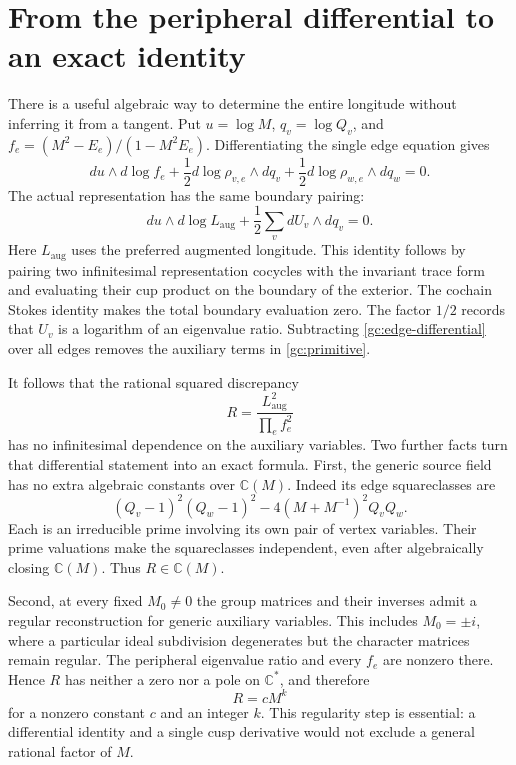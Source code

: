 \section{From the peripheral differential to an exact identity}
\label{gc:rigidity}

There is a useful algebraic way to determine the entire longitude
without inferring it from a tangent. Put
$u=\log M$, $q_v=\log Q_v$, and
$f_e=(M^2-E_e)/(1-M^2E_e)$.
Differentiating the single edge equation gives
\begin{equation}\label{gc:edge-differential}
 du\wedge d\log f_e
 +\frac12 d\log\rho_{v,e}\wedge dq_v
 +\frac12 d\log\rho_{w,e}\wedge dq_w=0.
\end{equation}
The actual representation has the same boundary pairing:
\[
 du\wedge d\log L_{\mathrm{aug}}
       +\frac12\sum_v dU_v\wedge dq_v=0.
\]
Here $L_{\mathrm{aug}}$ uses the preferred augmented longitude.
This identity follows by pairing two infinitesimal representation
cocycles with the invariant trace form and evaluating their cup
product on the boundary of the exterior. The cochain Stokes
identity makes the total boundary evaluation zero. The factor
$1/2$ records that $U_v$ is a logarithm of an eigenvalue ratio.
Subtracting \eqref{gc:edge-differential} over all edges removes
the auxiliary terms in \eqref{gc:primitive}.

It follows that the rational squared discrepancy
\begin{equation}\label{gc:discrepancy}
 R=\frac{L_{\mathrm{aug}}^2}{\prod_e f_e^2}
\end{equation}
has no infinitesimal dependence on the auxiliary variables.
Two further facts turn that differential statement into an exact
formula. First, the generic source field has no extra algebraic
constants over $\mathbb C(M)$. Indeed its edge squareclasses are
\[
 (Q_v-1)^2(Q_w-1)^2
                 -4(M+M^{-1})^2Q_vQ_w.
\]
Each is an irreducible prime involving its own pair of vertex
variables. Their prime valuations make the squareclasses
independent, even after algebraically closing $\mathbb C(M)$.
Thus $R\in\mathbb C(M)$.

Second, at every fixed $M_0\ne0$ the group matrices and their
inverses admit a regular reconstruction for generic auxiliary
variables. This includes $M_0=\pm i$, where a particular ideal
subdivision degenerates but the character matrices remain regular.
The peripheral eigenvalue ratio and every $f_e$ are nonzero
there. Hence $R$ has neither a zero nor a pole on
$\mathbb C^*$, and therefore
\begin{equation}\label{gc:monomial}
                         R=cM^k
\end{equation}
for a nonzero constant $c$ and an integer $k$.
This regularity step is essential: a differential identity and a
single cusp derivative would not exclude a general rational
factor of $M$.

